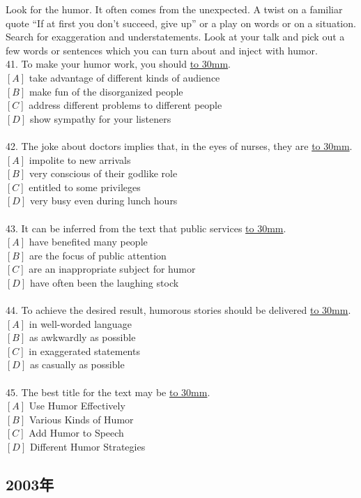 \documentclass[a4paper]{article}
\begin{document}
\par
Look for the humor. It often comes from the unexpected. A twist on a familiar quote “If at first you don’t succeed, give up” or a play on words or on a situation. Search for exaggeration and understatements. Look at your talk and pick out a few words or sentences which you can turn about and inject with humor.
\\41.	To make your humor work, you should \underline{\hbox to 30mm{}}.\\$[A]$ take advantage of different kinds of audience\\$[B]$ make fun of the disorganized people\\$[C]$ address different problems to different people\\$[D]$ show sympathy for your listeners\\\\42.	The joke about doctors implies that, in the eyes of nurses, they are \underline{\hbox to 30mm{}}.\\$[A]$ impolite to new arrivals\\$[B]$ very conscious of their godlike role\\$[C]$ entitled to some privileges\\$[D]$ very busy even during lunch hours\\\\43.	It can be inferred from the text that public services \underline{\hbox to 30mm{}}.\\$[A]$ have benefited many people\\$[B]$ are the focus of public attention\\$[C]$ are an inappropriate subject for humor\\$[D]$ have often been the laughing stock\\\\44.	To achieve the desired result, humorous stories should be delivered \underline{\hbox to 30mm{}}.\\$[A]$ in well-worded language\\$[B]$ as awkwardly as possible\\$[C]$ in exaggerated statements\\$[D]$ as casually as possible\\\\45.	The best title for the text may be \underline{\hbox to 30mm{}}.\\$[A]$ Use Humor Effectively\\$[B]$ Various Kinds of Humor\\$[C]$ Add Humor to Speech\\$[D]$ Different Humor Strategies\\\subsection{2003年}
\end{document}
